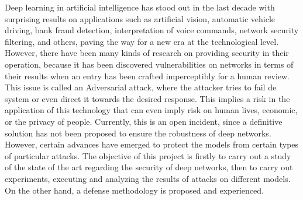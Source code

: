 \documentclass[
11pt, %
spanish, %
singlespacing, %
headsepline, %
]{MastersDoctoralThesis} %
\begin{document}
\begin{extraAbstract}
\addchaptertocentry{\extraabstractname} %
Deep learning in artificial intelligence has stood out in the last decade with surprising results on applications such as artificial vision, automatic vehicle driving, bank fraud detection, interpretation of voice commands, network security filtering, and others, paving the way for a new era at the technological level. However, there have been many kinds of research on providing security in their operation, because it has been discovered vulnerabilities on networks in terms of their results when an entry has been crafted imperceptibly for a human review. This issue is called an Adversarial attack, where the attacker tries to fail de system or even direct it towards the desired response. This implies a risk in the application of this technology that can even imply risk on human lives, economic, or the privacy of people. Currently, this is an open incident, since a definitive solution has not been proposed to ensure the robustness of deep networks. However, certain advances have emerged to protect the models from certain types of particular attacks.
The objective of this project is firstly to carry out a study of the state of the art regarding the security of deep networks, then to carry out experiments, executing and analyzing the results of attacks on different models. On the other hand, a defense methodology is proposed and experienced.


    
\end{extraAbstract}
\end{document}
